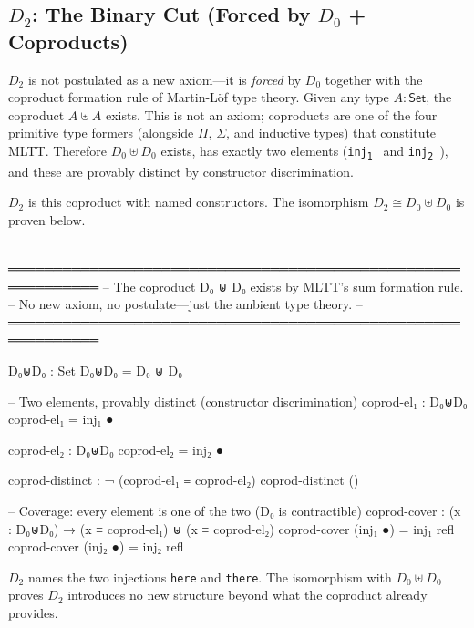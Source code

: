 \documentclass[11pt,a4paper]{article}
\begin{document}
\subsection{$D_2$: The Binary Cut (Forced by $D_0$ + Coproducts)}

$D_2$ is not postulated as a new axiom---it is \emph{forced} by $D_0$
together with the coproduct formation rule of Martin-L\"{o}f type theory.
Given any type $A : \mathsf{Set}$, the coproduct $A \uplus A$ exists.
This is not an axiom; coproducts are one of the four primitive type formers
(alongside $\Pi$, $\Sigma$, and inductive types) that constitute MLTT.
Therefore $D_0 \uplus D_0$ exists, has exactly two elements
(\texttt{inj\textsubscript{1}\,\textbullet} and
\texttt{inj\textsubscript{2}\,\textbullet}),
and these are provably distinct by constructor discrimination.

$D_2$ is this coproduct with named constructors. The isomorphism
$D_2 \cong D_0 \uplus D_0$ is proven below.

\begin{code}
-- ════════════════════════════════════════════════════════════
-- The coproduct D₀ ⊎ D₀ exists by MLTT's sum formation rule.
-- No new axiom, no postulate—just the ambient type theory.
-- ════════════════════════════════════════════════════════════

D₀⊎D₀ : Set
D₀⊎D₀ = D₀ ⊎ D₀

-- Two elements, provably distinct (constructor discrimination)
coprod-el₁ : D₀⊎D₀
coprod-el₁ = inj₁ ●

coprod-el₂ : D₀⊎D₀
coprod-el₂ = inj₂ ●

coprod-distinct : ¬ (coprod-el₁ ≡ coprod-el₂)
coprod-distinct ()

-- Coverage: every element is one of the two (D₀ is contractible)
coprod-cover : (x : D₀⊎D₀) → (x ≡ coprod-el₁) ⊎ (x ≡ coprod-el₂)
coprod-cover (inj₁ ●) = inj₁ refl
coprod-cover (inj₂ ●) = inj₂ refl
\end{code}

$D_2$ names the two injections \texttt{here} and \texttt{there}.
The isomorphism with $D_0 \uplus D_0$ proves $D_2$ introduces no
new structure beyond what the coproduct already provides.
\end{document}
